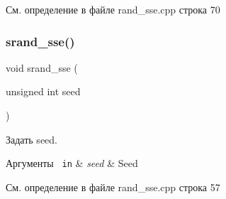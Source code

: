 См. определение в файле rand\+\_\+sse.\+cpp строка 70

\mbox{\label{group__rand__ssecpp_ga80db1a2aa7de7edf52b9c60e101d556f}} 
\subsubsection{\texorpdfstring{srand\_sse()}{srand\_sse()}}
{\footnotesize\ttfamily void srand\+\_\+sse (\begin{DoxyParamCaption}\item[{unsigned int}]{seed }\end{DoxyParamCaption})}



Задать seed. 


\begin{DoxyCode}{0}
\end{DoxyCode}
 
\begin{DoxyParams}[1]{Аргументы}
\mbox{\texttt{ in}}  & {\em seed} & Seed \\
\hline
\end{DoxyParams}


См. определение в файле rand\+\_\+sse.\+cpp строка 57

